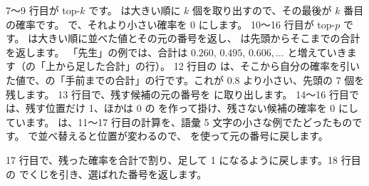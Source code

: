 7〜9 行目が top-$k$ です。
 は大きい順に $k$ 個を取り出すので、その最後が $k$ 番目の確率です。 で、それより小さい確率を 0 にします。
10〜16 行目が top-$p$ です。
 は大きい順に並べた値とその元の番号を返し、 は先頭からそこまでの合計を返します。
「先生」の例では、合計は $0.260,\,0.495,\,0.606,\dots$ と増えていきます（の「上から足した合計」の行）。
12 行目の  は、そこから自分の確率を引いた値で、の「手前までの合計」の行です。これが 0.8 より小さい、先頭の 7 個を残します。
13 行目で、残す候補の元の番号を  に取り出します。
14〜16 行目では、残す位置だけ 1、ほかは 0 の  を作って掛け、残さない候補の確率を 0 にしています。
は、11〜17 行目の計算を、語彙 5 文字の小さな例でたどったものです。%
 で並べ替えると位置が変わるので、 を使って元の番号に戻します。%

17 行目で、残った確率を合計で割り、足して 1 になるように戻します。18 行目の  でくじを引き、選ばれた番号を返します。

